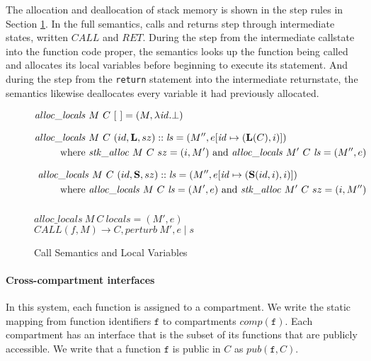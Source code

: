 \documentclass{article}
\begin{document}
The allocation and deallocation of stack memory is shown in the step rules in
Section \ref{fig:callret}. In the full semantics, calls and returns step through
intermediate states, written \(\mathit{CALL}\) and \(\mathit{RET}\). During the
step from the intermediate callstate into the function code proper, the semantics
looks up the function being called and allocates its local variables before beginning
to execute its statement. And during the step from the {\tt return} statement into
the intermediate returnstate, the semantics likewise deallocates every variable it had
previously allocated.

\begin{figure}

  \[\begin{split}
  \mathit{alloc\_locals} ~ & M ~ C ~ [~] = (M, \lambda \mathit{id} . \bot) \\[0.75em]
  \mathit{alloc\_locals} ~ & M ~ C ~ (id,\mathbf{L},sz)::\mathit{ls} =
  (M'', e[\mathit{id} \mapsto (\mathbf{L}(C),i)]) \\
  \textnormal{where } & \mathit{stk\_alloc} ~ M ~ C ~ sz = (i, M')
  \textnormal{ and } \mathit{alloc\_locals} ~ M' ~ C ~ \mathit{ls} = (M'', e) \\[0.75em]
  \mathit{alloc\_locals} & ~ M ~ C ~ (id,\mathbf{S},sz)::\mathit{ls} =
  (M'', e[\mathit{id} \mapsto (\mathbf{S}(id,i),i)]) \\
  \textnormal{where } & \mathit{alloc\_locals} ~ M ~ C ~ \mathit{ls} = (M', e)
  \textnormal{ and } \mathit{stk\_alloc} ~ M' ~ C ~ sz = (i, M'') \\[0.75em]
  \end{split}\]
      
              {\(\mathit{alloc\_locals} ~ M ~ C ~ \mathit{locals} = (M',e)\)}
              {\(\mathit{CALL}(f,M) \longrightarrow
                C,\mathit{perturb} ~ M',e \mid s\)}
  \caption{Call Semantics and Local Variables}
  \label{fig:callret}

\end{figure}

\paragraph{Cross-compartment interfaces}
\label{sec:interfaces}

In this system, each function is assigned to a compartment. We write the static mapping
from function identifiers \(\mathtt{f}\) to compartments \(\mathit{comp}(\mathtt{f})\).
Each compartment has an interface that is the subset of its functions that are publicly
accessible. We write that a function \(\mathtt{f}\) is public in \(C\) as
\(\mathit{pub}(\mathtt{f},C)\).
\end{document}
